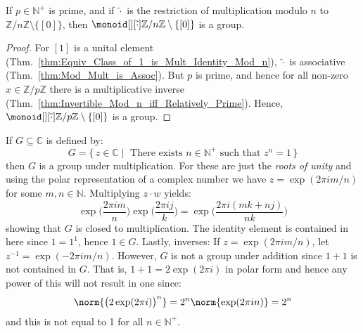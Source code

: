     \begin{theorem}
        If $p\in\mathbb{N}^{+}$ is prime, and if $\tilde{\cdot}$ is the
        restriction of multiplication modulo $n$ to
        $\mathbb{Z}/n\mathbb{Z}\setminus\{[0]\}$, then
        $\monoid[][\tilde{\cdot}]{\mathbb{Z}/n\mathbb{Z}\setminus\{[0]\}}$
        is a group.
    \end{theorem}
    \begin{proof}
        For $[1]$ is a unital element
        (Thm.~\ref{thm:Equiv_Class_of_1_is_Mult_Identity_Mod_n}),
        $\tilde{\cdot}$ is associative (Thm.~\ref{thm:Mod_Mult_is_Assoc}).
        But $p$ is prime, and hence for all non-zero
        $x\in\mathbb{Z}/p\mathbb{Z}$ there is a multiplicative inverse
        (Thm.~\ref{thm:Invertible_Mod_n_iff_Relatively_Prime}). Hence,
        $\monoid[][\tilde{\cdot}]{\mathbb{Z}/p\mathbb{Z}\setminus\{[0]\}}$
        is a group.
    \end{proof}
    \begin{example}
        If $G\subseteq\mathbb{C}$ is defined by:
        \begin{equation}
            G=\{\,z\in\mathbb{C}\;|\;
                \textrm{ There exists }n\in\mathbb{N}^{+}
                \textrm{ such that }z^{n}=1\,\}
        \end{equation}
        then $G$ is a group under multiplication. For these are just the
        \textit{roots of unity} and using the polar representation of a
        complex number we have $z=\exp(2\pi{i}m/n)$ for some
        $m,n\in\mathbb{N}$. Multiplying $z\cdot{w}$ yields:
        \begin{equation}
            \exp\Big(\frac{2\pi{i}m}{n}\Big)
                \exp\Big(\frac{2\pi{i}j}{k}\Big)
            =\exp\Big(\frac{2\pi{i}(mk+nj)}{nk}\Big)
        \end{equation}
        showing that $G$ is closed to multiplication. The identity element
        is contained in here since $1=1^{1}$, hence $1\in{G}$. Lastly,
        inverses: If $z=\exp(2\pi{i}m/n)$, let
        $z^{\minus{1}}=\exp(\minus{2}\pi{i}m/n)$. However, $G$ is not a
        group under addition since $1+1$ is not contained in $G$.
        That is, $1+1=2\exp(2\pi{i})$ in polar form and hence any power of
        this will not result in one since:
        \begin{equation}
            \norm{\big(2\exp(2\pi{i})\big)^{n}}
            =2^{n}\norm{\exp(2\pi{i}n)}=2^{n}
        \end{equation}
        and this is not equal to 1 for all $n\in\mathbb{N}^{+}$.
    \end{example}

